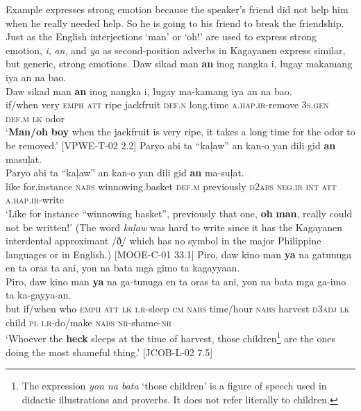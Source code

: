 Example  expresses strong emotion because the speaker’s friend did not help him when he really needed help. So he is going to his friend to break the friendship. Just as the English interjections ‘man’ or ‘oh!’ are used to express strong emotion, \textit{i}, \textit{an}, and \textit{ya} as second-position adverbs in Kagayanen express similar, but generic, strong emotions.
\ea
\label{bkm:Ref52607927}
Daw  sikad  man  \textbf{an}  inog  nangka  i,  lugay makamang  iya  an  na  bao. \\\smallskip
 \gll Daw  sikad  man  \textbf{an}  inog  nangka  i,  lugay ma-kamang  iya  an  na  bao. \\
if/when  very  \textsc{emph}  \textsc{att}  ripe  jackfruit  \textsc{def.n}  long.time
\textsc{a.hap.ir}-remove  3\textsc{s.gen}  \textsc{def.m}  \textsc{lk}  odor \\
\glt `\textbf{Man/oh} \textbf{boy} when the jackfruit is very ripe, it takes a long time for the odor to be removed.’ [VPWE-T-02 2.2]
\z
\ea
\label{bkm:Ref52607929}
Paryo  abi  ta  “kaļaw”  an  kan-o  yan  dili gid  \textbf{an}  masuļat. \\\smallskip
 \gll Paryo  abi  ta  “kaļaw”  an  kan-o  yan  dili gid  \textbf{an}  ma-suļat. \\
like  for.instance  \textsc{nabs}  winnowing.basket  \textsc{def.m}  previously  \textsc{d}2\textsc{abs}  \textsc{neg.ir}
\textsc{int}  \textsc{att}  \textsc{a.hap.ir-}write \\
\glt `Like for instance “winnowing basket”, previously that one, \textbf{oh} \textbf{man}, really could not be written!’ (The word \textit{kaļaw} was hard to write since it has the Kagayanen interdental approximant /ð̞/ which has no symbol in the major Philippine languages or in English.) [MOOE-C-01 33.1]
\z
\ea
\label{bkm:Ref52607977}
Piro,  daw  kino  man  \textbf{ya}  na  gatunuga  en  ta  oras  ta ani, yon  na  bata  mga  gimo  ta  kagayyaan. \\\smallskip
\gll Piro,  daw  kino  man  \textbf{ya}  na  ga-tunuga  en  ta  oras  ta ani, yon  na  bata  mga  ga-imo  ta  ka-gayya-an. \\
but  if/when  who  \textsc{emph}  \textsc{att}  \textsc{lk}  \textsc{i.r}-sleep  \textsc{cm}  \textsc{nab}\textsc{s}  time/hour  \textsc{nabs}  harvest
\textsc{d3adj}  \textsc{lk}  child  \textsc{pl}  \textsc{i.r}-do/make  \textsc{nabs}  \textsc{nr}-shame-\textsc{nr} \\
\glt `Whoever the \textbf{heck} sleeps at the time of harvest, those children\footnote{The expression \textit{yon na bata} ‘those children’ is a figure of speech used in didactic illustrations and proverbs. It does not refer literally to children.} are the ones doing the most shameful thing.’ [JCOB-L-02 7.5]
